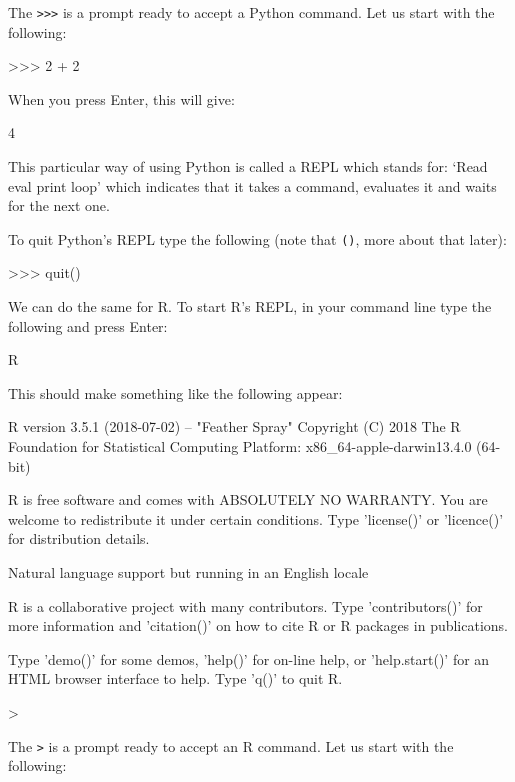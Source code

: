 The \texttt{>>>} is a prompt ready to accept a Python command. Let
us start with the following:

\begin{pyin}
>>> 2 + 2
\end{pyin}

When you press Enter, this will give:

\begin{pyout}
4
\end{pyout}

This particular way of using Python is called a REPL which stands for: `Read
eval print loop' which indicates that it takes a command, evaluates it and waits
for the next one.

To quit Python's REPL type the following (note that \texttt{()},
more about that later):

\begin{pyin}
>>> quit()
\end{pyin}

We can do the same for R. To start R's REPL, in your command line type the
following and press Enter:

\begin{cliin}
R
\end{cliin}

This should make something like the following appear:

\begin{cliout}
R version 3.5.1 (2018-07-02) -- "Feather Spray"
Copyright (C) 2018 The R Foundation for Statistical Computing
Platform: x86_64-apple-darwin13.4.0 (64-bit)

R is free software and comes with ABSOLUTELY NO WARRANTY.
You are welcome to redistribute it under certain conditions.
Type 'license()' or 'licence()' for distribution details.

  Natural language support but running in an English locale

R is a collaborative project with many contributors.
Type 'contributors()' for more information and
'citation()' on how to cite R or R packages in publications.

Type 'demo()' for some demos, 'help()' for on-line help, or
'help.start()' for an HTML browser interface to help.
Type 'q()' to quit R.

>
\end{cliout}

The \texttt{>} is a prompt ready to accept an R command. Let
us start with the following:

